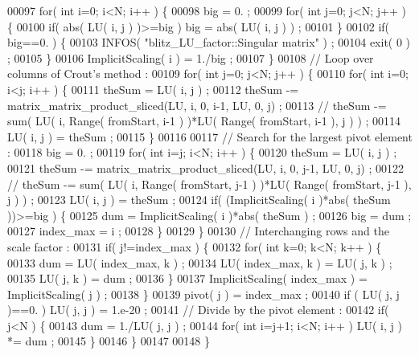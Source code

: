 \begin{DoxyCode}
00097     \textcolor{keywordflow}{for}( \textcolor{keywordtype}{int} i=0; i<N; i++ ) \{
00098       big = 0. ;
00099       \textcolor{keywordflow}{for}( \textcolor{keywordtype}{int} j=0; j<N; j++ ) \{
00100     \textcolor{keywordflow}{if}( abs( LU( i, j ) )>=big ) big = abs( LU( i, j ) ) ;
00101       \}
00102       \textcolor{keywordflow}{if}( big==0. ) \{
00103     INFOS( \textcolor{stringliteral}{"blitz\_LU\_factor::Singular matrix"} ) ;
00104     exit( 0 ) ;
00105       \}
00106       ImplicitScaling( i ) = 1./big ;
00107     \}
00108     \textcolor{comment}{// Loop over columns of Crout's method :}
00109     \textcolor{keywordflow}{for}( \textcolor{keywordtype}{int} j=0; j<N; j++ ) \{
00110       \textcolor{keywordflow}{for}( \textcolor{keywordtype}{int} i=0; i<j; i++ ) \{
00111     theSum = LU( i, j ) ;
00112     theSum -= matrix\_matrix\_product\_sliced(LU, i, 0, i-1, LU, 0, j) ;
00113     \textcolor{comment}{//  theSum -= sum( LU( i, Range( fromStart, i-1 ) )*LU( Range( fromStart, i-1 ), j ) ) ;}
00114     LU( i, j ) = theSum ;
00115       \}
00116       
00117       \textcolor{comment}{// Search for the largest pivot element :}
00118       big = 0. ;
00119       \textcolor{keywordflow}{for}( \textcolor{keywordtype}{int} i=j; i<N; i++ ) \{
00120     theSum = LU( i, j ) ;
00121     theSum -= matrix\_matrix\_product\_sliced(LU, i, 0, j-1, LU, 0, j) ;
00122     \textcolor{comment}{//  theSum -= sum( LU( i, Range( fromStart, j-1 ) )*LU( Range( fromStart, j-1 ), j ) ) ;}
00123     LU( i, j ) = theSum ;
00124     \textcolor{keywordflow}{if}( (ImplicitScaling( i )*abs( theSum ))>=big ) \{
00125       dum = ImplicitScaling( i )*abs( theSum ) ;
00126       big = dum ;
00127       index\_max = i ;
00128     \}
00129       \}
00130       \textcolor{comment}{// Interchanging rows and the scale factor :}
00131       \textcolor{keywordflow}{if}( j!=index\_max ) \{
00132     \textcolor{keywordflow}{for}( \textcolor{keywordtype}{int} k=0; k<N; k++ ) \{
00133       dum = LU( index\_max, k ) ;
00134       LU( index\_max, k ) = LU( j, k ) ;
00135       LU( j, k ) = dum ;
00136     \}
00137     ImplicitScaling( index\_max ) = ImplicitScaling( j ) ;
00138       \}
00139       pivot( j ) = index\_max ;
00140       \textcolor{keywordflow}{if} ( LU( j, j )==0. ) LU( j, j ) = 1.e-20 ;
00141       \textcolor{comment}{// Divide by the pivot element :}
00142       \textcolor{keywordflow}{if}( j<N ) \{
00143     dum = 1./LU( j, j ) ;
00144     \textcolor{keywordflow}{for}( \textcolor{keywordtype}{int} i=j+1; i<N; i++ ) LU( i, j ) *= dum ;
00145       \}
00146     \}
00147 
00148   \}

\end{DoxyCode}
